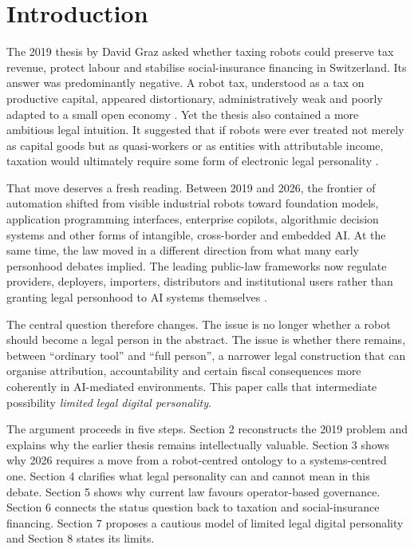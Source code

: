 \documentclass[11pt]{article}
\begin{document}
\section{Introduction}
The 2019 thesis by David Graz asked whether taxing robots could preserve tax revenue, protect labour and stabilise social-insurance financing in Switzerland. Its answer was predominantly negative. A robot tax, understood as a tax on productive capital, appeared distortionary, administratively weak and poorly adapted to a small open economy \citep{graz2019}. Yet the thesis also contained a more ambitious legal intuition. It suggested that if robots were ever treated not merely as capital goods but as quasi-workers or as entities with attributable income, taxation would ultimately require some form of electronic legal personality \citep{graz2019,oberson2017}.

That move deserves a fresh reading. Between 2019 and 2026, the frontier of automation shifted from visible industrial robots toward foundation models, application programming interfaces, enterprise copilots, algorithmic decision systems and other forms of intangible, cross-border and embedded AI. At the same time, the law moved in a different direction from what many early personhood debates implied. The leading public-law frameworks now regulate providers, deployers, importers, distributors and institutional users rather than granting legal personhood to AI systems themselves \citep{eu2024aiact,ec2026aiactfaq,ofcom2025swissai,coe2024framework}.

The central question therefore changes. The issue is no longer whether a robot should become a legal person in the abstract. The issue is whether there remains, between ``ordinary tool'' and ``full person'', a narrower legal construction that can organise attribution, accountability and certain fiscal consequences more coherently in AI-mediated environments. This paper calls that intermediate possibility \emph{limited legal digital personality}.

The argument proceeds in five steps. Section 2 reconstructs the 2019 problem and explains why the earlier thesis remains intellectually valuable. Section 3 shows why 2026 requires a move from a robot-centred ontology to a systems-centred one. Section 4 clarifies what legal personality can and cannot mean in this debate. Section 5 shows why current law favours operator-based governance. Section 6 connects the status question back to taxation and social-insurance financing. Section 7 proposes a cautious model of limited legal digital personality and Section 8 states its limits.
\end{document}
